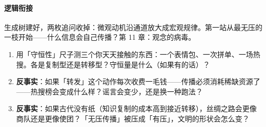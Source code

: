 \documentclass[../../main2.tex]{subfiles}
\begin{document}
\paragraph*{逻辑衔接}
	生成树建好，两枚追问收掉：微观动机沿通道放大成宏观规律。第一站从最无压的一枝开始——什么信息会自己传播？第 11 章：观念的病毒。

\begin{thinkbox}
\begin{enumerate}
	\item 用「守恒性」尺子测三个你天天接触的东西：一个表情包、一次拼单、一场热搜。各是复制型还是转移型？守恒量是什么（如果有的话）？
	\item \textbf{反事实}：如果「转发」这个动作每次收费一毛钱——传播必须消耗稀缺资源了——热搜榜会变成什么样？谣言会变少，还是换一种跑法？
	\item \textbf{反事实}：如果古代没有纸（知识复制的成本高到接近转移），丝绸之路会更像商队还是更像使团？「无压传播」被压成「有压」，文明的形状会怎么变？
\end{enumerate}
\end{thinkbox}
\end{document}
